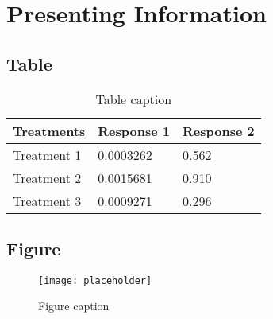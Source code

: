 \documentclass[11pt,fleqn]{book} %
\begin{document}


\chapter{Presenting Information}

\section{Table}

\begin{table}[h]
\centering
\begin{tabular}{l l l}
\toprule
\textbf{Treatments} & \textbf{Response 1} & \textbf{Response 2}\\
\midrule
Treatment 1 & 0.0003262 & 0.562 \\
Treatment 2 & 0.0015681 & 0.910 \\
Treatment 3 & 0.0009271 & 0.296 \\
\bottomrule
\end{tabular}
\caption{Table caption}
\end{table}


\section{Figure}

\begin{figure}[h]
\centering\texttt{[image: placeholder]}
\caption{Figure caption}
\end{figure}


\end{document}
